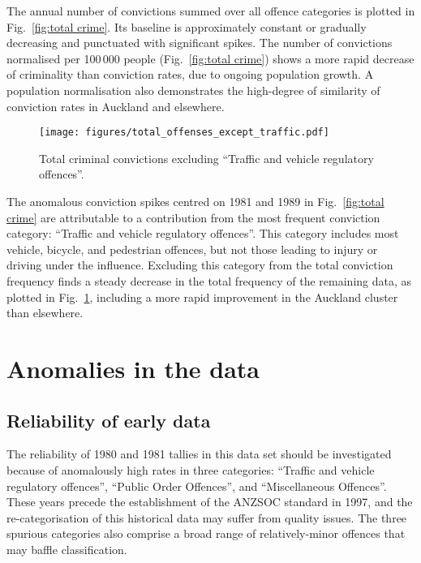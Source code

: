 \documentclass[onecolumn]{myarticle}
\begin{document}
The annual number of convictions summed over all offence categories is plotted in Fig.~\ref{fig:total crime}.
Its baseline is approximately constant or gradually decreasing and punctuated with significant spikes.
The number of convictions normalised per 100$\,$000 people (Fig.~\ref{fig:total crime}) shows a more rapid decrease of criminality than conviction rates, due to ongoing population growth.
A population normalisation also demonstrates the high-degree of similarity of conviction rates in Auckland and elsewhere.

\begin{figure}
  \centering
  \texttt{[image: figures/total\_offenses\_except\_traffic.pdf]}
  \caption{Total criminal convictions excluding ``Traffic and vehicle regulatory offences''.}
  \label{fig:total crime excluding traffic}
\end{figure}

The anomalous conviction spikes centred on 1981 and 1989 in Fig.~\ref{fig:total crime} are attributable to a contribution from the most frequent conviction category: ``Traffic and vehicle regulatory offences''.
This category includes most vehicle, bicycle, and pedestrian offences, but not those leading to injury or driving under the influence.
Excluding this category from the total conviction frequency finds a steady decrease in the total frequency of the remaining data, as plotted in Fig.~\ref{fig:total crime excluding traffic}, including a more rapid improvement in the Auckland cluster than elsewhere. 

\section*{Anomalies in the data}

\subsection*{Reliability of early data}

The reliability of 1980 and 1981 tallies in this data set should be investigated because of anomalously high rates in three categories: ``Traffic and vehicle regulatory offences'', ``Public Order Offences'', and ``Miscellaneous Offences''.
These years precede the establishment of the ANZSOC standard in 1997, and the re-categorisation of this historical data may suffer from quality issues. 
The three spurious categories also comprise a broad range of relatively-minor offences that may baffle classification.
\end{document}
